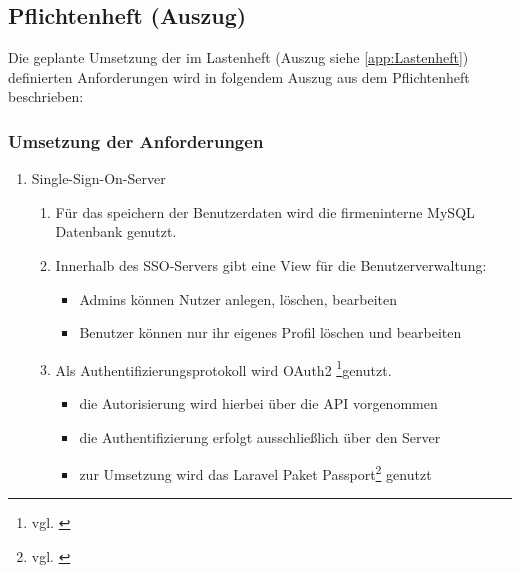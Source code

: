 \newpage
\subsection{Pflichtenheft (Auszug)}
\label{app:Pflichtenheft}

Die geplante Umsetzung der im Lastenheft (Auszug siehe \ref{app:Lastenheft}) definierten Anforderungen wird
in folgendem Auszug aus dem Pflichtenheft beschrieben:

\subsubsection*{Umsetzung der Anforderungen}

\begin{enumerate}[itemsep=0em,partopsep=0em,parsep=0em,topsep=0em]

\item Single-Sign-On-Server
	\begin{enumerate}
		\item Für das speichern der Benutzerdaten wird die firmeninterne MySQL Datenbank genutzt. 
		\item Innerhalb des \acs{SSO}-Servers gibt eine View für die Benutzerverwaltung:	
		\begin{itemize}
			\item Admins können Nutzer anlegen, löschen, bearbeiten
			\item Benutzer können nur ihr eigenes Profil löschen und bearbeiten
		\end{itemize}
	\item Als Authentifizierungsprotokoll wird OAuth2 \footnote{vgl. \cite{OAuth2}}genutzt.
	\begin{itemize}
		\item die Autorisierung wird hierbei über die API vorgenommen
		\item die Authentifizierung erfolgt ausschließlich über den Server
		\item zur Umsetzung wird das Laravel Paket Passport\footnote{vgl. \cite{Passport}} genutzt
	\end{itemize}
	\end{enumerate}


\end{enumerate}
